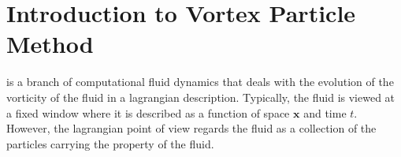 



\section{Introduction to Vortex Particle Method}
 is a branch of computational fluid dynamics that deals with the evolution of the vorticity of the fluid in a lagrangian description. Typically, the fluid is viewed at a fixed window where it is described as a function of space $\mathbf{x}$ and time $t$. However, the lagrangian point of view regards the fluid as a collection of the particles carrying the property of the fluid. 

